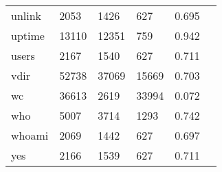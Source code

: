 \begin{longtable}{lp{2.4cm}p{2.4cm}p{2.4cm}p{2.4cm}p{2.4cm}}
unlink    &                                    2053 &                        1426 &                          627 &                                   0.695 \\
uptime    &                                   13110 &                       12351 &                          759 &                                   0.942 \\
users     &                                    2167 &                        1540 &                          627 &                                   0.711 \\
vdir      &                                   52738 &                       37069 &                        15669 &                                   0.703 \\
wc        &                                   36613 &                        2619 &                        33994 &                                   0.072 \\
who       &                                    5007 &                        3714 &                         1293 &                                   0.742 \\
whoami    &                                    2069 &                        1442 &                          627 &                                   0.697 \\
yes       &                                    2166 &                        1539 &                          627 &                                   0.711 \\
\end{longtable}
